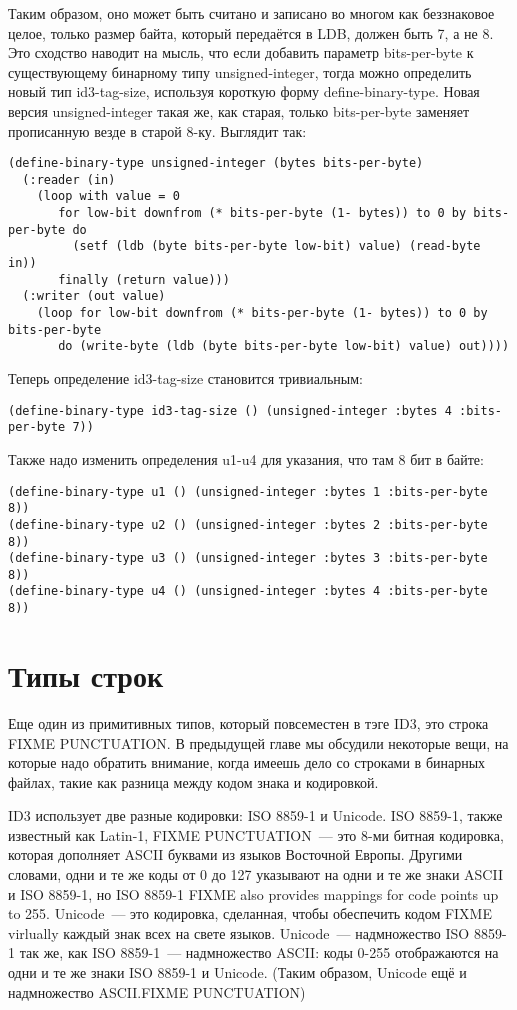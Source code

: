 Таким образом, оно может быть считано и записано во многом как беззнаковое целое, только
размер байта, который передаётся в LDB, должен быть 7, а не 8.  Это сходство наводит на
мысль, что если добавить параметр bits-per-byte к существующему бинарному типу
unsigned-integer, тогда можно определить новый тип id3-tag-size, используя короткую форму
define-binary-type.  Новая версия unsigned-integer такая же, как старая, только
bits-per-byte заменяет прописанную везде в старой 8-ку.  Выглядит так:

\begin{lstlisting}
(define-binary-type unsigned-integer (bytes bits-per-byte)
  (:reader (in)
    (loop with value = 0
       for low-bit downfrom (* bits-per-byte (1- bytes)) to 0 by bits-per-byte do
         (setf (ldb (byte bits-per-byte low-bit) value) (read-byte in))
       finally (return value)))
  (:writer (out value)
    (loop for low-bit downfrom (* bits-per-byte (1- bytes)) to 0 by bits-per-byte
       do (write-byte (ldb (byte bits-per-byte low-bit) value) out))))
\end{lstlisting}

Теперь определение id3-tag-size становится тривиальным:

\begin{lstlisting}
(define-binary-type id3-tag-size () (unsigned-integer :bytes 4 :bits-per-byte 7))
\end{lstlisting}

Также надо изменить определения u1-u4 для указания, что там 8 бит в байте:

\begin{lstlisting}
(define-binary-type u1 () (unsigned-integer :bytes 1 :bits-per-byte 8))
(define-binary-type u2 () (unsigned-integer :bytes 2 :bits-per-byte 8))
(define-binary-type u3 () (unsigned-integer :bytes 3 :bits-per-byte 8))
(define-binary-type u4 () (unsigned-integer :bytes 4 :bits-per-byte 8))
\end{lstlisting}

\section{Типы строк}

Еще один из примитивных типов, который повсеместен в тэге ID3, это строка FIXME
PUNCTUATION.  В предыдущей главе мы обсудили некоторые вещи, на которые надо обратить
внимание, когда имеешь дело со строками в бинарных файлах, такие как разница между кодом
знака и кодировкой.

ID3 использует две разные кодировки: ISO 8859-1 и Unicode. ISO 8859-1, также известный как
Latin-1, FIXME PUNCTUATION~--- это 8-ми битная кодировка, которая дополняет ASCII буквами
из языков Восточной Европы.  Другими словами, одни и те же коды от 0 до 127 указывают на
одни и те же знаки ASCII и ISO 8859-1, но ISO 8859-1 FIXME also provides mappings for code
points up to 255.  Unicode~--- это кодировка, сделанная, чтобы обеспечить кодом FIXME
virlually каждый знак всех на свете языков.  Unicode~--- надмножество ISO 8859-1 так же,
как ISO 8859-1~--- надмножество ASCII: коды 0-255 отображаются на одни и те же знаки ISO
8859-1 и Unicode. (Таким образом, Unicode ещё и надмножество ASCII.FIXME PUNCTUATION)

